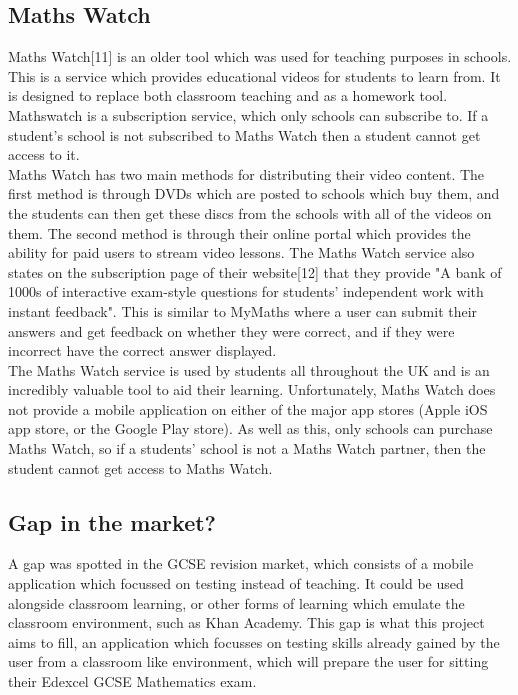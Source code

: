 \documentclass{article}
\begin{document}
\subsection{Maths Watch}

Maths Watch[11] is an older tool which was used for teaching purposes in schools. This is a service which provides educational videos for students to learn from. It is designed to replace both classroom teaching and as a homework tool. Mathswatch is a subscription service, which only schools can subscribe to. If a student's school is not subscribed to Maths Watch then a student cannot get access to it. \\

Maths Watch has two main methods for distributing their video content. The first method is through DVDs which are posted to schools which buy them, and the students can then get these discs from the schools with all of the videos on them. The second method is through their online portal which provides the ability for paid users to stream video lessons. The Maths Watch service also states on the subscription page of their website[12] that they provide "A bank of 1000s of interactive exam-style questions for students' independent work with instant feedback". This is similar to MyMaths where a user can submit their answers and get feedback on whether they were correct, and if they were incorrect have the correct answer displayed. \\

The Maths Watch service is used by students all throughout the UK and is an incredibly valuable tool to aid their learning. Unfortunately, Maths Watch does not provide a mobile application on either of the major app stores (Apple iOS app store, or the Google Play store). As well as this, only schools can purchase Maths Watch, so if a students' school is not a Maths Watch partner, then the student cannot get access to Maths Watch. \\

\subsection{Gap in the market?}

A gap was spotted in the GCSE revision market, which consists of a mobile application which focussed on testing instead of teaching. It could be used alongside classroom learning, or other forms of learning which emulate the classroom environment, such as Khan Academy. This gap is what this project aims to fill, an application which focusses on testing skills already gained by the user from a classroom like environment, which will prepare the user for sitting their Edexcel GCSE Mathematics exam. \\
\end{document}
